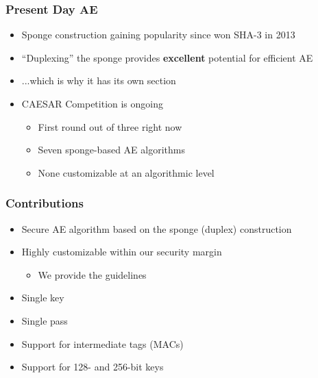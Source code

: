 \begin{frame}
\frametitle{Present Day AE}
\begin{itemize}
  \item Sponge construction gaining popularity since \Keccak won SHA-3 in 2013
  \item ``Duplexing'' the sponge provides \textbf{excellent} potential for efficient AE
  \item ...which is why it has its own section
  \item CAESAR Competition is ongoing
  \begin{itemize}
    \item First round out of three right now
    \item Seven sponge-based AE algorithms
    \item None customizable at an algorithmic level
  \end{itemize}
\end{itemize}
\end{frame}

\begin{frame}
\frametitle{Contributions}
\begin{itemize}
  \item Secure AE algorithm based on the sponge (duplex) construction
  \item Highly customizable within our security margin
  \begin{itemize}
    \item We provide the guidelines
  \end{itemize}
  \item Single key 
  \item Single pass
  \item Support for intermediate tags (MACs)
  \item Support for 128- and 256-bit keys
\end{itemize}
\end{frame}

